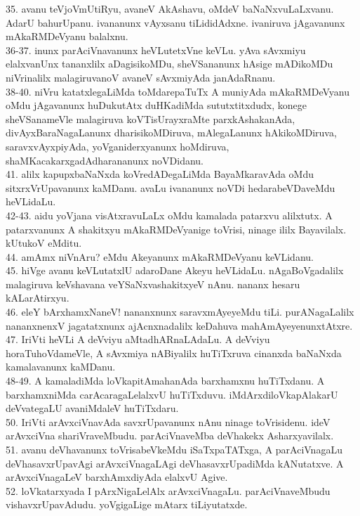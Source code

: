 \documentclass{article}
\begin{document}
35. avanu teVjoVmUtiRyu, avaneV AkAshavu, oMdeV baNaNxvuLaLxvanu. AdarU bahurUpanu. ivananunx vAyxsanu tiLididAdxne. ivaniruva jAgavanunx mAkaRMDeVyanu balalxnu.\\
36-37. inunx parAciVnavanunx heVLutetxVne keVLu. yAva sAvxmiyu elalxvanUnx tananxlilx aDagisikoMDu, sheVSananunx hAsige mADikoMDu niVrinalilx malagiruvanoV avaneV sAvxmiyAda janAdaRnanu.\\
38-40. niVru katatxlegaLiMda toMdarepaTuTx A muniyAda mAkaRMDeVyanu oMdu jAgavanunx huDukutAtx duHKadiMda sututxtitxdudx, konege sheVSanameVle malagiruva koVTisUrayxraMte parxkAshakanAda, divAyxBaraNagaLanunx dharisikoMDiruva, mAlegaLanunx hAkikoMDiruva, saravxvAyxpiyAda, yoVganiderxyanunx hoMdiruva, shaMKacakarxgadAdharananunx noVDidanu.\\
41. alilx kapupxbaNaNxda koVredADegaLiMda BayaMkaravAda oMdu sitxrxVrUpavanunx kaMDanu. avaLu ivananunx noVDi hedarabeVDaveMdu heVLidaLu.\\
42-43. aidu yoVjana visAtxravuLaLx oMdu kamalada patarxvu alilxtutx. A patarxvanunx A shakitxyu mAkaRMDeVyanige toVrisi, ninage ililx Bayavilalx. kUtukoV eMditu.\\
44. amAmx niVnAru? eMdu Akeyanunx mAkaRMDeVyanu keVLidanu.\\
45. hiVge avanu keVLutatxlU adaroDane Akeyu heVLidaLu. nAgaBoVgadalilx malagiruva keVshavana veYSaNxvashakitxyeV nAnu. nananx hesaru kALarAtirxyu.\\
46. eleY bArxhamxNaneV! nananxnunx saravxmAyeyeMdu tiLi. purANagaLalilx nananxnenxV jagatatxnunx ajAcnxnadalilx keDahuva mahAmAyeyenunxtAtxre.\\
47. IriVti heVLi A deVviyu aMtadhARnaLAdaLu. A deVviyu horaTuhoVdameVle, A sAvxmiya nABiyalilx huTiTxruva cinanxda baNaNxda kamalavanunx kaMDanu.\\
48-49. A kamaladiMda loVkapitAmahanAda barxhamxnu huTiTxdanu. A barxhamxniMda carAcaragaLelalxvU huTiTxduvu. iMdArxdiloVkapAlakarU deVvategaLU avaniMdaleV huTiTxdaru.\\
50. IriVti arAvxciVnavAda savxrUpavanunx nAnu ninage toVrisidenu. ideV arAvxciVna shariVraveMbudu. parAciVnaveMba deVhakekx Asharxyavilalx.\\
51. avanu deVhavanunx toVrisabeVkeMdu iSaTxpaTATxga, A parAciVnagaLu deVhasavxrUpavAgi arAvxciVnagaLAgi deVhasavxrUpadiMda kANutatxve. A arAvxciVnagaLeV barxhAmxdiyAda elalxvU Agive.\\
52. loVkatarxyada I pArxNigaLelAlx arAvxciVnagaLu. parAciVnaveMbudu vishavxrUpavAdudu. yoVgigaLige mAtarx tiLiyutatxde.\\
\end{document}
